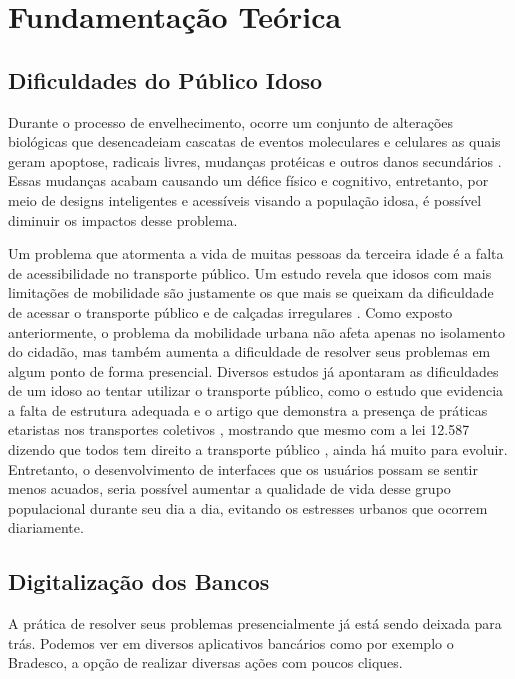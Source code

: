 \chapter{Fundamentação Teórica}

\section{Dificuldades do Público Idoso}

Durante o processo de envelhecimento, ocorre um conjunto de alterações biológicas que desencadeiam cascatas de eventos moleculares e celulares as quais geram apoptose, radicais livres, mudanças protéicas e outros danos secundários \citep{santos2009}. Essas mudanças acabam causando um défice físico e cognitivo, entretanto, por meio de designs inteligentes e acessíveis visando a população idosa, é possível diminuir os impactos desse problema.

Um problema que atormenta a vida de muitas pessoas da terceira idade é a falta de acessibilidade no transporte público. Um estudo revela que idosos com mais limitações de mobilidade são justamente os que mais se queixam da dificuldade de acessar o transporte público e de calçadas irregulares \citep{santos2017_acessibilidade_transporte}. Como exposto anteriormente, o problema da mobilidade urbana não afeta apenas no isolamento do cidadão, mas também aumenta a dificuldade de resolver seus problemas em algum ponto de forma presencial. Diversos estudos já apontaram as dificuldades de um idoso ao tentar utilizar o transporte público, como o estudo que evidencia a falta de estrutura adequada \citep{moura2019} e o artigo que demonstra a presença de práticas etaristas nos transportes coletivos \citep{moura_freitas_2023}, mostrando que mesmo com a lei 12.587 dizendo que todos tem direito a transporte público \citep{lei_mobilidade_urbana_2012}, ainda há muito para evoluir. Entretanto, o desenvolvimento de interfaces que os usuários possam se sentir menos acuados, seria possível aumentar a qualidade de vida desse grupo populacional durante seu dia a dia, evitando os estresses urbanos que ocorrem diariamente. 

\section{Digitalização dos Bancos}

A prática de resolver seus problemas presencialmente já está sendo deixada para trás. Podemos ver em diversos aplicativos bancários como por exemplo o Bradesco, a opção de realizar diversas ações com poucos cliques.

